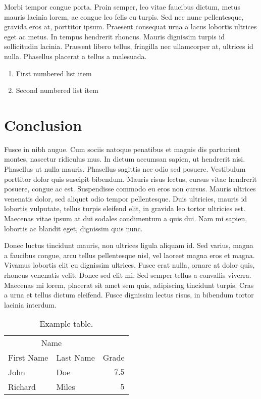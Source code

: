 \documentclass[
  UTF8, %
  12pt, %
]{essay} %
\begin{document}
Morbi tempor congue porta. Proin semper, leo vitae faucibus dictum, metus mauris lacinia lorem, ac congue leo felis eu turpis. Sed nec nunc pellentesque, gravida eros at, porttitor ipsum. Praesent consequat urna a lacus lobortis ultrices eget ac metus. In tempus hendrerit rhoncus. Mauris dignissim turpis id sollicitudin lacinia. Praesent libero tellus, fringilla nec ullamcorper at, ultrices id nulla. Phasellus placerat a tellus a malesuada.

\begin{enumerate}
  \item First numbered list item
  \item Second numbered list item
\end{enumerate}


\section*{Conclusion}

Fusce in nibh augue. Cum sociis natoque penatibus et magnis dis parturient montes, nascetur ridiculus mus. In dictum accumsan sapien, ut hendrerit nisi. Phasellus ut nulla mauris. Phasellus sagittis nec odio sed posuere. Vestibulum porttitor dolor quis suscipit bibendum. Mauris risus lectus, cursus vitae hendrerit posuere, congue ac est. Suspendisse commodo eu eros non cursus. Mauris ultrices venenatis dolor, sed aliquet odio tempor pellentesque. Duis ultricies, mauris id lobortis vulputate, tellus turpis eleifend elit, in gravida leo tortor ultricies est. Maecenas vitae ipsum at dui sodales condimentum a quis dui. Nam mi sapien, lobortis ac blandit eget, dignissim quis nunc.

Donec luctus tincidunt mauris, non ultrices ligula aliquam id. Sed varius, magna a faucibus congue, arcu tellus pellentesque nisl, vel laoreet magna eros et magna. Vivamus lobortis elit eu dignissim ultrices. Fusce erat nulla, ornare at dolor quis, rhoncus venenatis velit. Donec sed elit mi. Sed semper tellus a convallis viverra. Maecenas mi lorem, placerat sit amet sem quis, adipiscing tincidunt turpis. Cras a urna et tellus dictum eleifend. Fusce dignissim lectus risus, in bibendum tortor lacinia interdum.

\begin{table}[h] %
  \caption{Example table.}
  \centering
  \begin{tabular}{l l r}
    \toprule
    \multicolumn{2}{c}{Name}       \\
    \cmidrule(r){1-2}
    First Name & Last Name & Grade \\
    \midrule
    John       & Doe       & $7.5$ \\
    Richard    & Miles     & $5$   \\
    \bottomrule
  \end{tabular}
\end{table}
\end{document}
